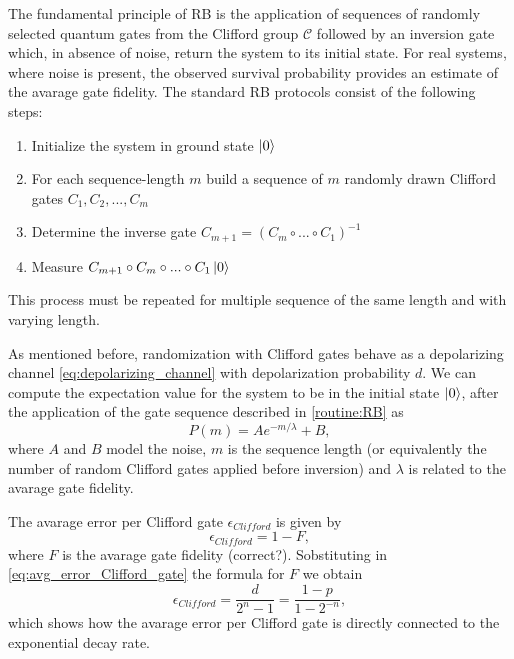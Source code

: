 The fundamental principle of RB is the application of sequences of randomly selected quantum gates from the Clifford group $\mathcal{C}$ followed by an inversion gate which, in absence of noise, return the system to its initial state. 
For real systems, where noise is present, the observed survival probability provides an estimate of the avarage gate fidelity.
The standard RB protocols consist of the following steps:\begin{enumerate}\label{routine:RB}
    \item Initialize the system in ground state $\ket{0}$
    \item For each sequence-length $m$ build a sequence of $m$ randomly drawn Clifford gates $C_1, C_2, ..., C_m$
    \item Determine the inverse gate $C_{m+1}=(C_m\circ...\circ C_1)^{-1}$
    \item Measure $C_{m+1}\circ C_m \circ ...\circ C_1 \ket{0}$
\end{enumerate}
This process must be repeated for multiple sequence of the same length and with varying length.

As mentioned before, randomization with Clifford gates behave as a depolarizing channel \ref{eq:depolarizing_channel} with depolarization probability $d$.
We can compute the expectation value for the system to be in the initial state $\ket{0}$, after the application of the gate sequence described in \ref{routine:RB} as \begin{equation}
    P(m) = Ae^{-m/\lambda} + B,
\end{equation}
where $A$ and $B$ model the noise, $m$ is the sequence length (or equivalently the number of random Clifford gates applied before inversion) and $\lambda$ is related to the avarage gate fidelity.
\begin{comment}
    The exponential form arises from modeling each gate application as an independent error process. When you compose multiple noisy gates, their error contributions multiply, leading naturally to an exponential decay.
\end{comment}    


The avarage error per Clifford gate $\epsilon_{Clifford}$ is given by\begin{equation}
    \epsilon_{Clifford} = 1 - F \label{eq:avg_error_Clifford_gate},
\end{equation}
where $F$ is the avarage gate fidelity (correct?). Sobstituting in \ref{eq:avg_error_Clifford_gate} the formula for $F$ we obtain \begin{equation}
    \epsilon_{Clifford} = \frac{d}{2^n -1} = \frac{1-p}{1-2^{-n}},
\end{equation}
which shows how the avarage error per Clifford gate is directly connected to the exponential decay rate.
